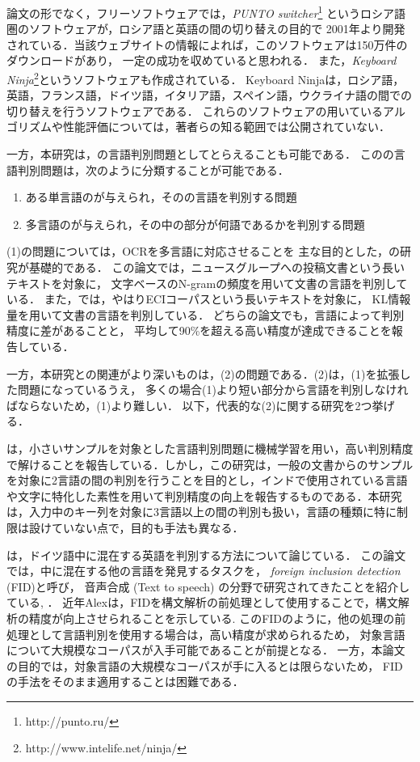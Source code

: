 \documentclass[japanese]{jnlp_1.4}
\renewcommand{\text}{}
\begin{document}
論文の形でなく，フリーソフトウェアでは，{\em PUNTO switcher}\footnote{http://punto.ru/}
というロシア語圏のソフトウェアが，ロシア語と英語の間の切り替えの目的で
2001年より開発されている．当該ウェブサイトの情報によれば，このソフトウェアは150万件のダウンロードがあり，
一定の成功を収めていると思われる．
また，{\em Keyboard Ninja}\footnote{http://www.intelife.net/ninja/}というソフトウェアも作成されている．
Keyboard Ninjaは，ロシア語，英語，フランス語，ドイツ語，イタリア語，スペイン語，ウクライナ語の間での
切り替えを行うソフトウェアである．
これらのソフトウェアの用いているアルゴリズムや性能評価については，著者らの知る範囲では公開されていない．

一方，本研究は，{\text}の言語判別問題としてとらえることも可能である．
この{\text}の言語判別問題は，次のように分類することが可能である．

\begin{enumerate}
\item ある単言語の{\text}が与えられ，その{\text}の言語を判別する問題
\item 多言語の{\text}が与えられ，その中の部分が何語であるかを判別する問題
\end{enumerate}

(1)の問題については，OCRを多言語に対応させることを
主な目的とした，\cite{cavnar}の研究が基礎的である．
この論文では，ニュースグループへの投稿文書という長いテキストを対象に，
文字ベースのN-gramの頻度を用いて文書の言語を判別している．
また，\cite{sibun}では，やはりECIコーパスという長いテキストを対象に，
KL情報量を用いて文書の言語を判別している．
どちらの論文でも，言語によって判別精度に差があることと，
平均して90\%を超える高い精度が達成できることを報告している．

一方，本研究との関連がより深いものは，(2)の問題である．(2)は，(1)を拡張した問題になっているうえ，
多くの場合(1)より短い部分から言語を判別しなければならないため，(1)より難しい．
以下，代表的な(2)に関する研究を2つ挙げる．

\cite{indian}は，小さいサンプルを対象とした言語判別問題に機械学習を用い，高い判別精度で解けることを報告している．しかし，この研究は，一般の文書からのサンプルを対象に2言語の間の判別を行うことを目的とし，インドで使用されている言語や文字に特化した素性を用いて判別精度の向上を報告するものである．本研究は，入力中のキー列を対象に3言語以上の間の判別も扱い，言語の種類に特に制限は設けていない点で，目的も手法も異なる．


\cite{alex2005}は，ドイツ語中に混在する英語を判別する方法について論じている．
この論文では，{\text}中に混在する他の言語を発見するタスクを，
{\em foreign inclusion detection} (FID)と呼び，
音声合成 (Text to speech) の分野で研究されてきたことを紹介している\cite{tts2003}, \cite{tts2005}．
近年Alexは，FIDを構文解析の前処理として使用することで，構文解析の精度が向上させられることを示している\cite{alex2007}.
このFIDのように，他の処理の前処理として言語判別を使用する場合は，高い精度が求められるため，
対象言語について大規模なコーパスが入手可能であることが前提となる．
一方，本論文の目的では，対象言語の大規模なコーパスが手に入るとは限らないため，
FIDの手法をそのまま適用することは困難である．
\end{document}
